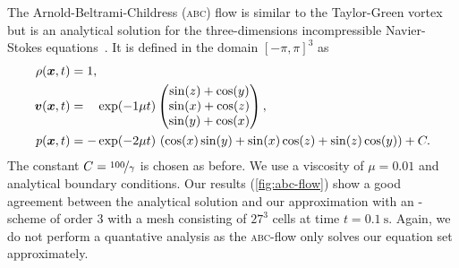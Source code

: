 \documentclass[runningheads]{llncs}
\begin{document}
The Arnold-Beltrami-Childress (\textsc{abc}) flow is similar to the Taylor-Green vortex but is an analytical solution for the three-dimensions incompressible Navier-Stokes equations~\cite{tavelli2016staggered}.
It is defined in the domain \( \left[ -\pi, \pi \right]^3 \) as
\begin{align}
  \label{eq:abc-flow}
  \begin{split}
  \rho(\bm{x}, t) &= 1,\\
  \bm{v}(\bm{x}, t) &= \phantom{-} \exp(-1\mu t)
  \begin{pmatrix}
    \sin(z) + \cos(y)\\
    \sin(x) + \cos(z)\\
    \sin(y) + \cos(x)
  \end{pmatrix}, \\
  p(\bm{x}, t) &= -\exp(-2 \mu t) \, \left(\cos(x)\sin(y) + \sin(x)\cos(z) + \sin(z)\cos(y)\right)
  + C.
  \end{split}
\end{align}
The constant $C = \nicefrac{100}{\gamma}$ is chosen as before.
We use a viscosity of $\mu = 0.01$ and analytical boundary conditions.
Our results (\cref{fig:abc-flow}) show a good agreement between the analytical solution and our approximation with an \aderdg{}-scheme of order $3$ with a mesh consisting of $27^3$ cells at time $t = \SI{0.1}{\s}$.
Again, we do not perform a quantative analysis as the \textsc{abc}-flow only solves our equation set approximately.
\end{document}
